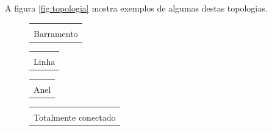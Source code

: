 A figura \ref{fig:topologia} mostra exemplos de algumas destas topologias.

\begin{figure}[h]
	\centering
	\newcommand\newtemplate[4][1.0]%
	{\newsavebox#2%
	 \savebox#2%
	  {\begin{tabular}{@{}c@{}}
		 \begin{tikzpicture}[scale=#1]
		 #4
		 \end{tikzpicture}\\[-0ex]
		 \templatecaption{#3}\\[-2ex]
	   \end{tabular}%
	  }%
	}
   \newcommand\template[1]{\usebox{#1}}             %
   \newcommand\templatecaption[1]{{\sffamily\small#1}}       %
   \newcommand\Tr{\mathop{\mathrm{Tr}}}
   
   
   \newtemplate\bus{Barramento}{
	   \draw
	   node at (0,0)[no] (A){A} 
	   node[no,right of=A] (B){B} 
	   node[no,right of=B] (C){C} 
	   node[no,right of=C] (D){D} 
	   node[no,right of=D] (E){E} 
	   node[no,right of=E] (F){F};
	   
	   
	   \draw[]($(A)+(-0.5,0.6)$)--($(F)+(0.5,0.6)$);
	   \draw[]($(A)+(0,0.6)$)--(A);
	   \draw[]($(B)+(0,0.6)$)--(B);
	   \draw[]($(C)+(0,0.6)$)--(C);
	   \draw[]($(D)+(0,0.6)$)--(D);
	   \draw[]($(E)+(0,0.6)$)--(E);
	   \draw[]($(F)+(0,0.6)$)--(F);
   }
   
   \newtemplate\linha{Linha}{
   \draw
	   node at (0,0)[no] (A){A} 
	   node[no,right of=A] (B){B} 
	   node[no,right of=B] (C){C} 
	   node[no,right of=C] (D){D} 
	   node[no,right of=D] (E){E} 
	   node[no,right of=E] (F){F};
	   
	   
	   \draw[](A)--(B);
	   \draw[](B)--(C);
	   \draw[](C)--(D);
	   \draw[](D)--(E);
	   \draw[](E)--(F);
   }
   
   \newtemplate[0.8]\anel{Anel}{
	   \draw
	   node at (  0:1.5)[no] (A){A} 
	   node at ( 60:1.5)[no] (B){B} 
	   node at (120:1.5)[no] (C){C} 
	   node at (180:1.5)[no] (D){D} 
	   node at (240:1.5)[no] (E){E} 
	   node at (300:1.5)[no] (F){F};
	   
	   
	   \draw[](A)--(B);
	   \draw[](B)--(C);
	   \draw[](C)--(D);
	   \draw[](D)--(E);
	   \draw[](E)--(F);
	   \draw[](F)--(A);
   }
   
   \newtemplate[0.8]\cheio{Totalmente conectado}{
	   \draw
	   node at (  0:1.5)[no] (A){A} 
	   node at ( 60:1.5)[no] (B){B} 
	   node at (120:1.5)[no] (C){C} 
	   node at (180:1.5)[no] (D){D} 
	   node at (240:1.5)[no] (E){E} 
	   node at (300:1.5)[no] (F){F};
	   
}
\end{figure}

